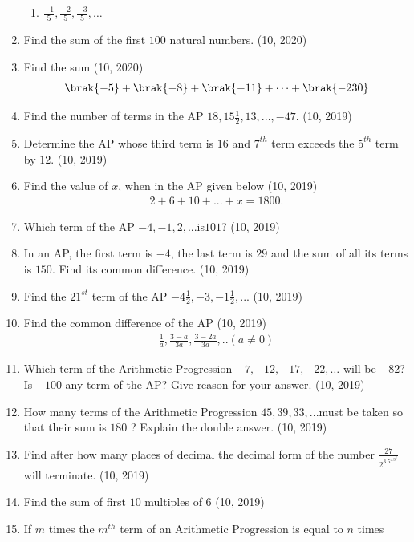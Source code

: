 \begin{enumerate}[label=\thesubsection.\arabic*,ref=\thesubsection.\theenumi,itemsep=1pt]
\begin{multicols}{2}
\begin{enumerate}
	        \item $\frac{-1}{5},\frac{-2}{5},\frac{-3}{5},\dots$ 
\end{enumerate}
\end{multicols}
 \item Find the sum of the first $100$ natural numbers.	
	\hfill (10, 2020)
 \item Find the sum
\hfill (10, 2020)
\begin{align*}
	\brak{-5} + \brak{-8} + \brak{-11} + \dots + \brak{-230}
\end{align*}
 \item Find the number of terms in the AP 
    $18,15\frac{1}{2},13, ...,-47.$
\hfill (10, 2019) \item Determine the AP whose third term is $16$ and $7^{th}$ term exceeds the $5^{th}$ term by $12$.
%
\hfill (10, 2019) \item Find the value of $x$, when in the AP given below
\hfill (10, 2019)
\begin{align*}
2 + 6 + 10 + ... + x = 1800.    
\end{align*}
 \item Which term of the AP $-4, - 1, 2, ... $is$ 101$?
\hfill (10, 2019) \item In an AP, the first term is $- 4$, the last term is $29$ and the sum of all its terms is $150$. Find its common difference.
\hfill (10, 2019) \item Find the $21^{st}$ term of the AP $-4 \frac{1}{2},-3,-1\frac{1}{2},...$
\hfill (10, 2019) \item Find the common difference of the AP 
\hfill (10, 2019)
\begin{align*}
\frac{1}{a} , \frac{3-a}{3a},\frac{3-2a}{3a} , . . (a \neq 0)
\end{align*}
 \item Which term of the Arithmetic Progression $-7, -12, -17, -22, \dots$ will be $-82$? Is $-100$ any term of the AP? Give reason for your answer.
\hfill (10, 2019) \item How many terms of the Arithmetic Progression $45, 39, 33, ... $must be taken so that their sum is $180$ ? Explain the double answer.
\hfill (10, 2019) \item Find after how many places of decimal the decimal form of the number $\frac {27}{2^3.5^4.3^2}$ will terminate.
\hfill (10, 2019) \item Find the sum of first $10$ multiples of $6$
\hfill (10, 2019) \item If $m$ times the $m^{th}$ term of an Arithmetic Progression is equal to $n$ times

\end{enumerate}
